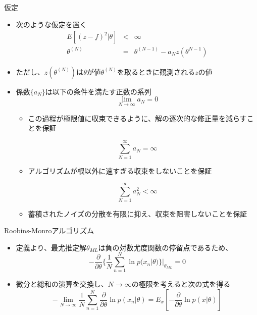 \begin{frame}{仮定}
 \begin{itemize}
  \item 次のような仮定を置く
        \begin{eqnarray}
         E[(z-f)^2|\theta] &<& \infty\\
         \theta^{(N)}&=& \theta^{(N-1)}-a_Nz(\theta^{N-1})
        \end{eqnarray}
  \item ただし、$z(\theta^{(N)})$は$\theta$が値$\theta^{(N)}$を取るときに観測される$z$の値
  \item 係数$\{a_N\}$は以下の条件を満たす正数の系列
        \begin{equation}
         \lim_{N \rightarrow \infty}a_N=0
        \end{equation}
        \begin{itemize}
         \item この過程が極限値に収束できるように、解の逐次的な修正量を減らすことを保証
        \end{itemize}
        \begin{equation}
         \sum_{N=1}^{\infty}a_N=\infty
        \end{equation}
        \begin{itemize}
         \item アルゴリズムが根以外に速すぎる収束をしないことを保証
        \end{itemize}
        \begin{equation}
         \sum_{N=1}^{\infty}a_N^2 < \infty
        \end{equation}
        \begin{itemize}
         \item 蓄積されたノイズの分散を有限に抑え、収束を阻害しないことを保証
        \end{itemize}
 \end{itemize}
\end{frame}

\begin{frame}{Roobins-Monroアルゴリズム}
 \begin{itemize}
  \item 定義より、最尤推定解$\theta_{ML}$は負の対数尤度関数の停留点であるため、
        \begin{equation}
         -\frac{\partial }{\partial \theta}\{\frac{1}{N}\sum_{n=1}^{N}\ln  p(x_n|\theta)\}|_{\theta_{ML}} = 0
        \end{equation}
  \item 微分と総和の演算を交換し、$N\rightarrow\infty$の極限を考えると次の式を得る
        \begin{equation}
         -\lim_{N \rightarrow \infty}\frac{1}{N}\sum_{n=1}^{N}\frac{\partial}{\partial \theta}\ln p(x_n|\theta)=E_x[-\frac{\partial}{\partial \theta}\ln p(x|\theta)]
        \end{equation}
 \end{itemize}
\end{frame}


